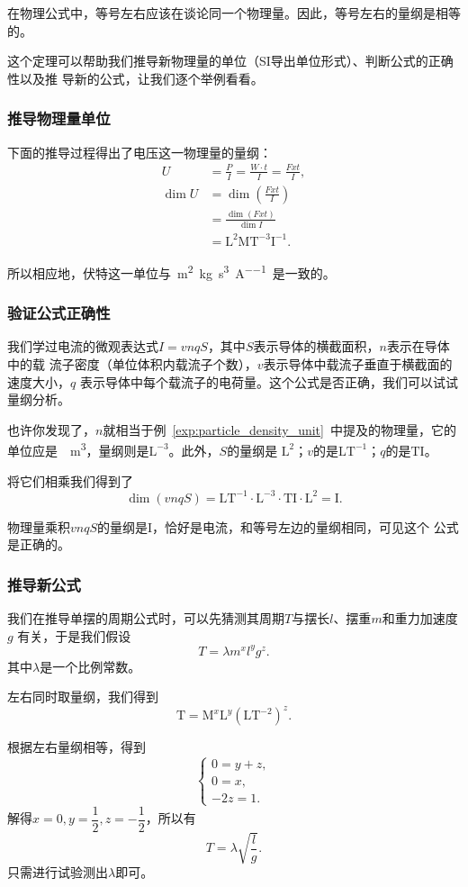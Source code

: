 \begin{rawthm}
    在物理公式中，等号左右应该在谈论同一个物理量。因此，等号左右的量纲是相等的。
\end{rawthm}

这个定理可以帮助我们推导新物理量的单位（SI导出单位形式）、判断公式的正确性以及推
导新的公式，让我们逐个举例看看。

\subsubsection{推导物理量单位}

下面的推导过程得出了电压这一物理量的量纲：
\begin{align*}
    U &= \frac{P}{I} = \frac{W\cdot t}{I} = \frac{Fxt}{I},\\
    \dim U &= \dim \left( \frac{Fxt}{I} \right) \\
                      &= \frac{\dim (Fxt)}{\dim I} \\
                      &= \mathrm{L^2MT^{-3}I^{-1}}
.\end{align*} 

所以相应地，伏特这一单位与~\unit{\square\m\kg\per\cubic\s\per\A}~是一致的。

\subsubsection{验证公式正确性}

我们学过电流的微观表达式$I=vnqS$，其中$S$表示导体的横截面积，$n$表示在导体中的载
流子密度（单位体积内载流子个数），$v$表示导体中载流子垂直于横截面的速度大小，$q$
表示导体中每个载流子的电荷量。这个公式是否正确，我们可以试试量纲分析。

也许你发现了，$n$就相当于例~\ref{exp:particle_density_unit}~中提及的物理量，它的
单位应是~\unit{\per\cubic\meter}，量纲则是$\mathrm{L^{-3}}$。此外，$S$的量纲是
$\mathrm{L^2}$；$v$的是$\mathrm{LT^{-1}}$；$q$的是$\mathrm{TI}$。

将它们相乘我们得到了
\[
    \dim (vnqS) = \mathrm{LT^{-1}\cdot L^{-3}\cdot TI\cdot L^2 = I }
.\] 

物理量乘积$vnqS$的量纲是$\mathrm{I}$，恰好是电流，和等号左边的量纲相同，可见这个
公式是正确的。

\subsubsection{推导新公式}

我们在推导单摆的周期公式时，可以先猜测其周期$T$与摆长$l$、摆重$m$和重力加速度$g$
有关，于是我们假设
\[
    T = \lambda m^{x}l^{y}g^{z}   
.\]
其中$\lambda $是一个比例常数。

左右同时取量纲，我们得到
\[
    \mathrm{T} = \mathrm{M}^{x}\mathrm{L}^{y}\left( \mathrm{LT}^{-2} \right)^{z} 
.\] 

根据左右量纲相等，得到
\[
    \begin{cases}
        0=y+z,\\
        0=x,\\
        -2z=1.
    \end{cases}
\] 
解得$x=0,y=\dfrac{1}{2},z=-\dfrac{1}{2}$，所以有
\[
    T = \lambda \sqrt{\frac{l}{g}} 
.\] 
只需进行试验测出$\lambda$即可。
